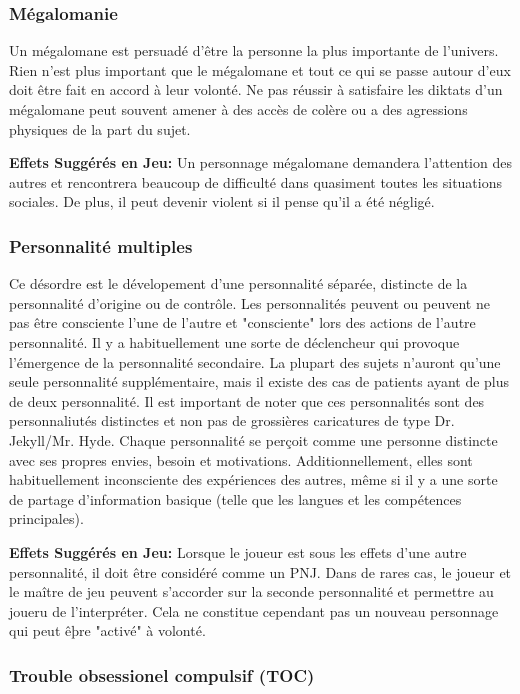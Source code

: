 \subsubsection{Mégalomanie} 

Un mégalomane est persuadé d'être la personne la plus importante de l'univers. Rien n'est plus important que le mégalomane et tout ce qui se passe autour d'eux doit être fait en accord à leur volonté. Ne pas réussir à satisfaire les diktats d'un mégalomane peut souvent amener à des accès de colère ou a des agressions physiques de la part du sujet. 

\textbf{Effets Suggérés en Jeu:} Un personnage mégalomane demandera l'attention des autres et rencontrera beaucoup de difficulté dans quasiment toutes les situations sociales. De plus, il peut devenir violent si il pense qu'il a été négligé. 

\subsubsection{Personnalité multiples} 

Ce désordre est le dévelopement d'une personnalité séparée, distincte de la personnalité d'origine ou de contrôle. Les personnalités peuvent ou peuvent ne pas être consciente l'une de l'autre et "consciente" lors des actions de l'autre personnalité. Il y a habituellement une sorte de déclencheur qui provoque l'émergence de la personnalité secondaire. La plupart des sujets n'auront qu'une seule personnalité supplémentaire, mais il existe des cas de patients ayant de plus de deux personnalité. Il est important de noter que ces personnalités sont des personnaliutés distinctes et non pas de grossières caricatures de type Dr. Jekyll/Mr. Hyde. Chaque personnalité se perçoit comme une personne distincte avec ses propres envies, besoin et motivations. Additionnellement, elles sont habituellement inconsciente des expériences des autres, même si il y a une sorte de partage d'information basique (telle que les langues et les compétences principales). 

\textbf{Effets Suggérés en Jeu:} Lorsque le joueur est sous les effets d'une autre personnalité, il doit être considéré comme un PNJ. Dans de rares cas, le joueur et le maître de jeu peuvent s'accorder sur la seconde personnalité et permettre au joueru de l'interpréter. Cela ne constitue cependant pas un nouveau personnage qui peut êþre "activé" à volonté. 

\subsubsection{Trouble obsessionel compulsif (TOC)} 

